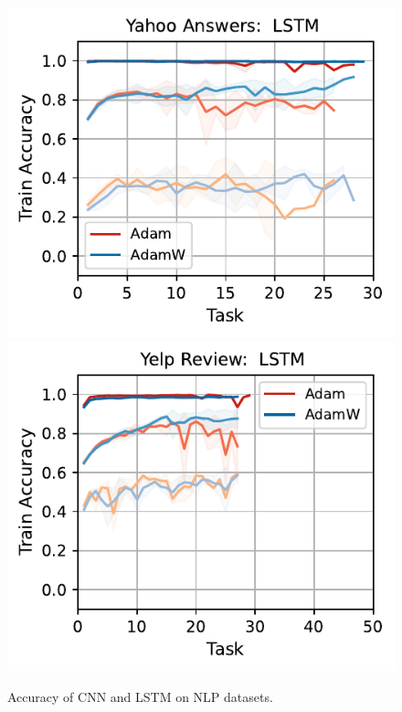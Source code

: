 \begin{figure}[htb!]
{        \includegraphics[width=\textwidth]{figs/Accuracy/nlp/lstm/yahoo_answers_50.pdf}
        \includegraphics[width=\textwidth]{figs/Accuracy/nlp/lstm/yelp_review_full_50.pdf}
    }
    \caption{Accuracy of CNN and LSTM on NLP datasets.}
    \label{fig:nlp_cnn_lstm}
\end{figure}

